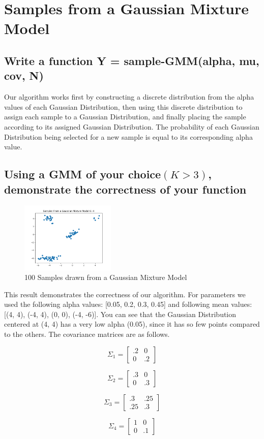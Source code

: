 \documentclass[a4paper]{article}
\begin{document}
        \clearpage
	\section{Samples from a Gaussian Mixture Model}
	\subsection{Write a function Y = sample-GMM(alpha, mu, cov, N)}
	
	Our algorithm works first by constructing a discrete distribution from the alpha values of each Gaussian Distribution, then using this discrete distribution to assign each sample to a Gaussian Distribution, and finally placing the sample according to its assigned Gaussian Distribution.  The probability of each Gaussian Distribution being selected for a new sample is equal to its corresponding alpha value.
	
	\subsection{Using a GMM of your choice$ (K > 3)$, demonstrate the correctness of your function}
	
	\begin{figure}[h]
			\begin{center}
				\includegraphics[width=0.4\textwidth]{GMM_samples.png}
				\caption{100 Samples drawn from a Gaussian Mixture Model}
			\end{center}
		\end{figure}
	
	This result demonstrates the correctness of our algorithm.  For parameters we used the following alpha values: [0.05, 0.2, 0.3, 0.45] and following mean values: [(4, 4), (-4, 4), (0, 0), (-4, -6)].  You can see that the Gaussian Distribution centered at (4, 4) has a very low alpha (0.05), since it has so few points compared to the others.  The covariance matrices are as follows.
	
	\[
	\Sigma_1 = 
 	\begin{bmatrix}
  	.2 & 0 \\
  	0 & .2
 	\end{bmatrix}
 	\]
	
	\[	
	\Sigma_2 = 
 	\begin{bmatrix}
  	.3 & 0 \\
  	0 & .3
 	\end{bmatrix}
 	\]
	
	\[
	\Sigma_3 = 
 	\begin{bmatrix}
  	.3 & .25 \\
  	.25 & .3
 	\end{bmatrix}
 	\]
 	
 	\[
 	\Sigma_4 = 
 	\begin{bmatrix}
  	1 & 0 \\
  	0 & .1
 	\end{bmatrix}
	\]
	
\end{document}
